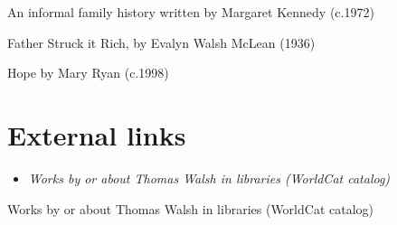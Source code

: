 An informal family history written by Margaret Kennedy (c.1972)

Father Struck it Rich, by Evalyn Walsh McLean (1936)

Hope by Mary Ryan (c.1998)

\section{External links}\label{external-links}

\begin{itemize}
\item
  \emph{Works by or about Thomas Walsh in libraries (WorldCat catalog)}
\end{itemize}

Works by or about Thomas Walsh in libraries (WorldCat catalog)

